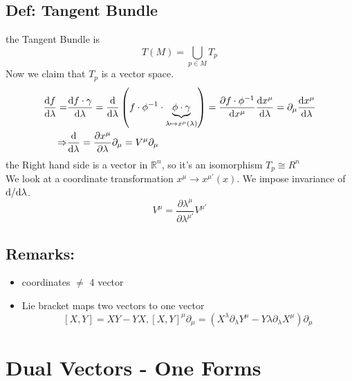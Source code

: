 \subsection{Def: Tangent Bundle}
the Tangent Bundle is
$$
T(M) = \bigcup_{p\in M} T_p
$$
Now we claim that $T_p$ is a vector space.
\begin{align}
	\frac{\text df}{\text d\lambda} =& \frac{\text df\cdot \gamma}{\text d\lambda} = \frac{\text d}{\text d\lambda}\left(f\cdot \phi^{-1} \cdot \underbrace{\phi \cdot \gamma}_{\lambda\mapsto x^\mu(\lambda)}\right)
	= \frac{\partial f\cdot \phi^{-1}}{\text d x^\mu} \frac{\text dx^\mu}{\text d\lambda}
	= \partial_\mu \frac{\text dx^\mu}{\text d\lambda}\\
	\Rightarrow& \frac{\text d}{\text d\lambda} = \frac{\partial x^\mu}{\partial \lambda}\partial_\mu = V^\mu \partial_\mu
\end{align}
the Right hand side is a vector in $\mathbb R^n$, so it's an isomorphism $T_p \cong R^n$\\
We look at a coordinate transformation $x^\mu \rightarrow x^{\mu'}(x)$. We impose invariance of $\text d/\text d\lambda$.
$$
V^\mu = \frac{\partial \lambda^\mu}{\partial \lambda^{\mu'}}V^{\mu'}
$$
\subsection{Remarks:}
\begin{itemize}
	\item coordinates $\neq$ 4 vector
	\item Lie bracket maps two vectors to one vector
		$$
		[X,Y] = XY - YX ,  [X,Y]^\mu\partial_\mu = (X^\lambda\partial_\lambda Y^\mu - Y\lambda\partial_\lambda X^\mu)\partial_\mu
		$$
\end{itemize}

\section{Dual Vectors - One Forms}

